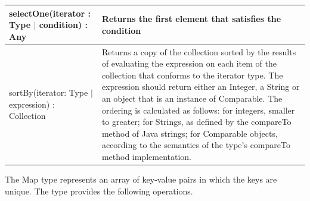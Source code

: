 \begin{longtabu} {|p{6.5cm}|X|}
    selectOne(iterator : Type $|$ condition) : Any & Returns the first element that satisfies the condition \\\hline
    
    sortBy(iterator: Type $|$ expression) : Collection & Returns a copy of the collection sorted by the results of evaluating the expression on each item of the collection that conforms to the iterator type. The expression should return either an Integer, a String or an object that is an instance of Comparable. The ordering is calculated as follows: for integers, smaller to greater; for Strings, as defined by the compareTo method of Java strings; for Comparable objects, according to the semantics of the type's compareTo method implementation.  \\\hline
\end{longtabu}

The Map type represents an array of key-value pairs in which the keys are unique. The type provides the following operations.

